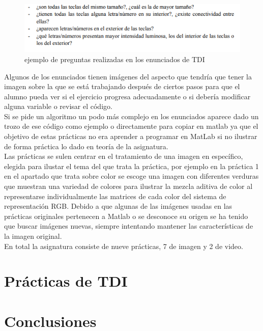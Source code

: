 \documentclass[a4paper,12pt]{report}
\begin{document}
\begin{figure}[h]
\centering
\includegraphics[width=1\textwidth]{preguntasp4}
\caption{ejemplo de preguntas realizadas en los enunciados de TDI}
\label{preguntasp4}
\end{figure}

Algunos de los enunciados tienen imágenes del aspecto que tendría que tener la imagen sobre la que se está trabajando después de ciertos pasos para que el alumno pueda ver si el ejercicio progresa adecuadamente o si debería modificar alguna variable o revisar el código.\\

Si se pide un algoritmo un podo más complejo en los enunciados aparece dado un trozo de ese código como ejemplo o directamente para copiar en matlab ya que el objetivo de estas prácticas no era aprender a programar en MatLab si no ilustrar de forma práctica lo dado en teoría de la asignatura.\\

Las prácticas se sulen centrar en el tratamiento de una imagen en específico, elegida para ilustar el tema del que trata la práctica, por ejemplo en la práctica 1 en el apartado que trata sobre color se escoge una imagen con diferentes verduras que muestran una variedad de colores para ilustrar la mezcla aditiva de color al representarse individualmente las matrices de cada color del sistema de representación RGB. Debido a que algunas de las imágenes usadas en las prácticas originales pertenecen a Matlab o se desconoce su origen se ha tenido que buscar imágenes nuevas, siempre intentando mantener las características de la imagen original.\\

En total la asignatura consiste de nueve prácticas, 7 de imagen y 2 de video. \\

\chapter{Prácticas de TDI}

\chapter{Conclusiones}
\end{document}
